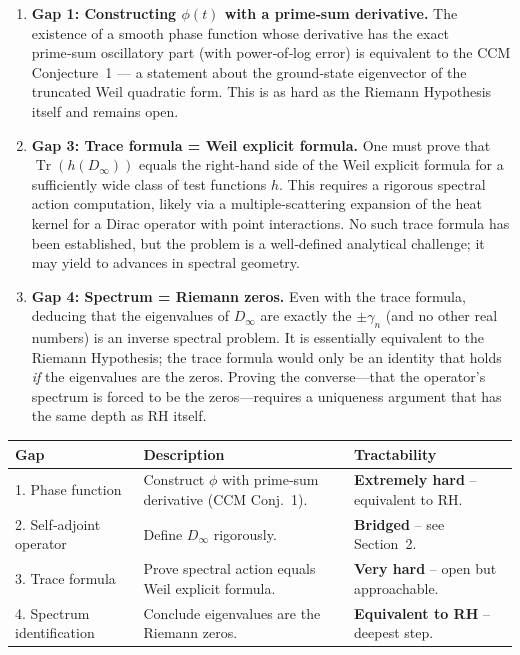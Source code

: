 \documentclass[12pt,a4paper]{article}
\begin{document}
\begin{enumerate}
\item \textbf{Gap 1: Constructing \(\phi(t)\) with a prime‑sum derivative.}  
The existence of a smooth phase function whose derivative has the exact prime‑sum oscillatory part (with power‑of‑log error) is equivalent to the CCM Conjecture~1 — a statement about the ground‑state eigenvector of the truncated Weil quadratic form.  This is as hard as the Riemann Hypothesis itself and remains open.
\item \textbf{Gap 3: Trace formula = Weil explicit formula.}  
One must prove that \(\operatorname{Tr}(h(D_\infty))\) equals the right‑hand side of the Weil explicit formula for a sufficiently wide class of test functions \(h\).  This requires a rigorous spectral action computation, likely via a multiple‑scattering expansion of the heat kernel for a Dirac operator with point interactions.  No such trace formula has been established, but the problem is a well‑defined analytical challenge; it may yield to advances in spectral geometry.
\item \textbf{Gap 4: Spectrum = Riemann zeros.}  
Even with the trace formula, deducing that the eigenvalues of \(D_\infty\) are exactly the \(\pm \gamma_n\) (and no other real numbers) is an inverse spectral problem.  It is essentially equivalent to the Riemann Hypothesis; the trace formula would only be an identity that holds \emph{if} the eigenvalues are the zeros.  Proving the converse—that the operator’s spectrum is forced to be the zeros—requires a uniqueness argument that has the same depth as RH itself.
\end{enumerate}

\begin{center}
\begin{tabular}{p{3cm}p{7cm}p{3.5cm}}
\hline
\textbf{Gap} & \textbf{Description} & \textbf{Tractability} \\
\hline
1. Phase function & Construct \(\phi\) with prime‑sum derivative (CCM Conj.~1). & \textbf{Extremely hard} – equivalent to RH. \\
2. Self‑adjoint operator & Define \(D_\infty\) rigorously. & \textbf{Bridged} – see Section~2. \\
3. Trace formula & Prove spectral action equals Weil explicit formula. & \textbf{Very hard} – open but approachable. \\
4. Spectrum identification & Conclude eigenvalues are the Riemann zeros. & \textbf{Equivalent to RH} – deepest step. \\
\hline
\end{tabular}
\end{center}
\end{document}
